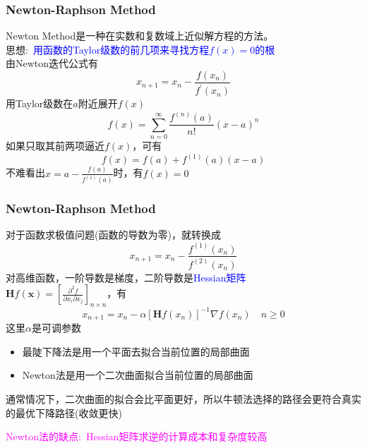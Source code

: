 \frame
{
	\frametitle{\textrm{Newton-Raphson Method}}
	\textrm{Newton Method}是一种在实数和复数域上近似解方程的方法。\\
	思想:~\textcolor{blue}{用函数的\textrm{Taylor}级数的前几项来寻找方程$f(x)=0$的根}\\
	由\textrm{Newton}迭代公式有
	\begin{displaymath}
		x_{n+1}=x_n-\dfrac{f(x_n)}{f^{\prime}(x_n)}
	\end{displaymath}
	用\textrm{Taylor}级数在$a$附近展开$f(x)$
	\begin{displaymath}
		f(x)=\sum_{n=0}^{\infty}\dfrac{f^{(n)}(a)}{n!}(x-a)^n
	\end{displaymath}
	如果只取其前两项逼近$f(x)$，可有
	\begin{displaymath}
		f(x)=f(a)+f^{(1)}(a)(x-a)
	\end{displaymath}
	不难看出$x=a-\frac{f(a)}{f^{(1)}(a)}$时，有$f(x)=0$
}

\frame
{
	\frametitle{\textrm{Newton-Raphson Method}}
	对于函数求极值问题(函数的导数为零)，就转换成
	\begin{displaymath}
		x_{n+1}=x_{n}-\dfrac{f^{(1)}(x_n)}{f^{(2)}(x_n)}
	\end{displaymath}
	对高维函数，一阶导数是梯度，二阶导数是\textcolor{blue}{\textrm{Hessian}矩阵}\\$\mathbf{H}f(\mathbf{x})=[\frac{\partial^2f}{\partial x_i\partial x_j}]_{n\times n}$，有
	\begin{displaymath}
		x_{n+1}=x_n-\alpha[\mathbf{H}f(x_n)]^{-1}\nabla f(x_n)\quad n\geqslant0
	\end{displaymath}
	这里$\alpha$是可调参数%

	\begin{itemize}
		\item 最陡下降法是用一个平面去拟合当前位置的局部曲面
		\item \textrm{Newton}法是用一个二次曲面拟合当前位置的局部曲面
	\end{itemize}
通常情况下，二次曲面的拟合会比平面更好，所以牛顿法选择的路径会更符合真实的最优下降路径(收敛更快)

\textcolor{magenta}{\textrm{Newton}法的缺点:~\textrm{Hessian}矩阵求逆的计算成本和复杂度较高}
}

